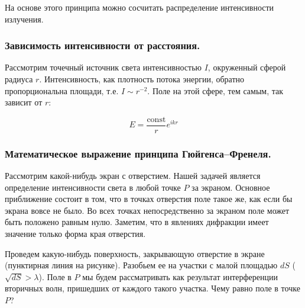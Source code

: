 \documentclass[11pt,a4paper]{article}
\numberwithin{equation}{section}
\newcommand{\const}{\mathrm{const}}
\begin{document}
На основе этого принципа можно сосчитать распределение интенсивности излучения. 

\subsubsection{Зависимость интенсивности от расстояния.}
\label{sec:intensity_distance}

Рассмотрим точечный источник света интенсивностью $I$, окруженный
сферой радиуса $r$. Интенсивность, как плотность потока энергии,
обратно пропорциональна площади, т.е. $I \sim r^{-2}$. Поле на этой
сфере, тем самым, так зависит от $r$:

\begin{equation}
E = \frac{\const}{r} e^{i k r}
\end{equation}

\subsubsection{Математическое выражение принципа Гюйгенса--Френеля.}

Рассмотрим какой-нибудь экран с отверстием. Нашей задачей является
определение интенсивности света в любой точке $P$ за экраном. Основное
приближение состоит в том, что в точках отверстия поле такое же, как
если бы экрана вовсе не было. Во всех точках непосредственно за
экраном поле может быть положено равным нулю. Заметим, что в явлениях
дифракции имеет значение только форма края отверстия.

\begin{figure}
  \begin{center}
  \end{center}
  \label{fig:huygens_fresnel}
\end{figure}

Проведем какую-нибудь поверхность, закрывающую отверстие в экране
(пунктирная линия на рисунке). Разобьем ее на участки с малой площадью
$dS$ ($\sqrt{dS} > \lambda$). Поле в $P$ мы будем рассматривать как
результат интерференции вторичных волн, пришедших от каждого такого
участка. Чему равно поле в точке $P$?
\end{document}
